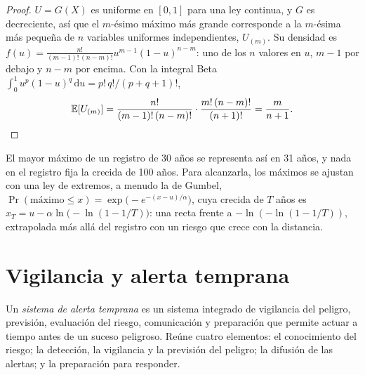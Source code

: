 \begin{proof}
$U = G(X)$ es uniforme en $[0, 1]$ para una ley continua, y $G$ es decreciente, así que el
$m$-ésimo máximo más grande corresponde a la $m$-ésima más pequeña de $n$ variables uniformes independientes,
$U_{(m)}$. Su densidad es $f(u) = \frac{n!}{(m-1)!\,(n-m)!}u^{m-1}(1-u)^{n-m}$: uno de los $n$ valores
en $u$, $m - 1$ por debajo y $n - m$ por encima. Con la integral Beta $\int_0^1 u^{p}(1-u)^{q}\,\mathrm{d}u
= p!\,q!/(p + q + 1)!$,
\begin{equation*}
\mathbb{E}[U_{(m)}] = \frac{n!}{(m-1)!\,(n-m)!}\cdot\frac{m!\,(n-m)!}{(n+1)!} = \frac{m}{n+1}. \qedhere
\end{equation*}
\end{proof}

El mayor máximo de un registro de 30 años se representa así en 31 años, y nada en el registro fija
la crecida de 100 años. Para alcanzarla, los máximos se ajustan con una ley de extremos, a menudo la de Gumbel,
$\Pr(\text{máximo} \leq x) = \exp\bigl(-e^{-(x - u)/\alpha}\bigr)$, cuya crecida de $T$ años es $x_T = u
- \alpha\ln\bigl(-\ln(1 - 1/T)\bigr)$: una recta frente a $-\ln(-\ln(1 - 1/T))$, extrapolada
más allá del registro con un riesgo que crece con la distancia.

\section{Vigilancia y alerta temprana}\label{sec:b2:geological-hazards:warning}

\begin{definition}\label{def:b2:geological-hazards:warning}
Un \emph{sistema de alerta temprana} es un sistema integrado de vigilancia del
peligro, previsión, evaluación del riesgo, comunicación y preparación que permite actuar a tiempo
antes de un suceso peligroso. Reúne cuatro elementos: el conocimiento del riesgo; la detección,
la vigilancia y la previsión del peligro; la difusión de las alertas; y la preparación para
responder.
\end{definition}


